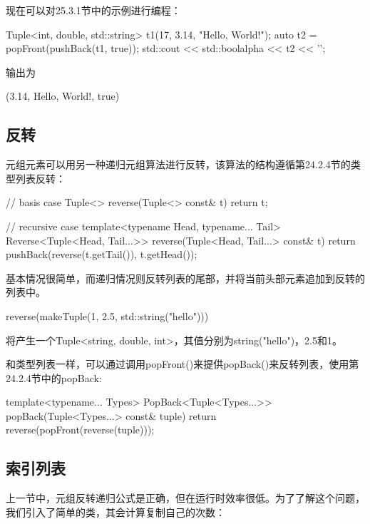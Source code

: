 现在可以对25.3.1节中的示例进行编程：

\begin{cpp}
Tuple<int, double, std::string> t1(17, 3.14, "Hello, World!");
auto t2 = popFront(pushBack(t1, true));
std::cout << std::boolalpha << t2 << '\n';
\end{cpp}

输出为

\begin{shell}
(3.14, Hello, World!, true)
\end{shell}

\subsection{反转}

元组元素可以用另一种递归元组算法进行反转，该算法的结构遵循第24.2.4节的类型列表反转：

\begin{cpp}
// basis case
Tuple<> reverse(Tuple<> const& t)
{
	return t;
}

// recursive case
template<typename Head, typename... Tail>
Reverse<Tuple<Head, Tail...>> reverse(Tuple<Head, Tail...> const& t)
{
	return pushBack(reverse(t.getTail()), t.getHead());
}
\end{cpp}

基本情况很简单，而递归情况则反转列表的尾部，并将当前头部元素追加到反转的列表中。

\begin{cpp}
reverse(makeTuple(1, 2.5, std::string("hello")))
\end{cpp}

将产生一个Tuple<string, double, int>，其值分别为string("hello")，2.5和1。

和类型列表一样，可以通过调用popFront()来提供popBack()来反转列表，使用第24.2.4节中的popBack:

\begin{cpp}
template<typename... Types>
PopBack<Tuple<Types...>>
popBack(Tuple<Types...> const& tuple)
{
	return reverse(popFront(reverse(tuple)));
}
\end{cpp}

\subsection{索引列表}

上一节中，元组反转递归公式是正确，但在运行时效率很低。为了了解这个问题，我们引入了简单的类，其会计算复制自己的次数：

